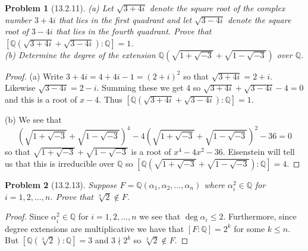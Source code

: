 \documentclass{article}
\newtheorem{problem}{Problem}
\begin{document}
\begin{problem}[13.2.11]
(a) Let $\sqrt{3 + 4i}$ denote the square root of the complex number $3 + 4i$ that lies in the first quadrant and let $\sqrt{3 - 4i}$ denote the square root of $3 - 4i$ that lies in the fourth quadrant. Prove that $[\mathbb{Q}(\sqrt{3 + 4i} + \sqrt{3-4i}) : \mathbb{Q}] = 1$.\\
(b) Determine the degree of the extension $\mathbb{Q}(\sqrt{1 + \sqrt{-3}} + \sqrt{1 - \sqrt{-3}})$ over $\mathbb{Q}$.
\end{problem}
\begin{proof}
(a) Write $3 + 4i = 4 + 4i - 1 = (2+i)^2$ so that $\sqrt{3+4i} = 2+i$. Likewise $\sqrt{3-4i} = 2-i$. Summing these we get $4$ so $\sqrt{3 + 4i} + \sqrt{3 - 4i} - 4 = 0$ and this is a root of $x - 4$. Thus $[\mathbb{Q}(\sqrt{3 + 4i} + \sqrt{3-4i}) : \mathbb{Q}] = 1$.

(b) We see that
\[
\left (\sqrt{1 + \sqrt{-3}} + \sqrt{1 - \sqrt{-3}} \right )^4 - 4 \left (\sqrt{1 + \sqrt{-3}} + \sqrt{1 - \sqrt{-3}} \right )^2 - 36 = 0
\]
so that $\sqrt{1 + \sqrt{-3}} + \sqrt{1 - \sqrt{-3}}$ is a root of $x^4 - 4x^2 - 36$. Eisenstein will tell us that this is irreducible over $\mathbb{Q}$ so $[\mathbb{Q}(\sqrt{1 + \sqrt{-3}} + \sqrt{1 - \sqrt{-3}}) : \mathbb{Q}] = 4$.
\end{proof}

\begin{problem}[13.2.13]
Suppose $F = \mathbb{Q}(\alpha_1, \alpha_2, \dots , \alpha_n)$ where $\alpha_i^2 \in \mathbb{Q}$ for $i = 1, 2, \dots , n$. Prove that $\sqrt[3]{2} \notin F$.
\end{problem}
\begin{proof}
Since $\alpha_i^2 \in \mathbb{Q}$ for $i = 1, 2, \dots , n$ we see that $\deg \alpha_i \leq 2$. Furthermore, since degree extensions are multiplicative we have that $[F : \mathbb{Q}] = 2^k$ for some $k \leq n$. But $[\mathbb{Q}(\sqrt[3]{2}) : \mathbb{Q}] = 3$ and $3 \nmid 2^k$ so $\sqrt[3]{2} \notin F$.
\end{proof}
\end{document}
